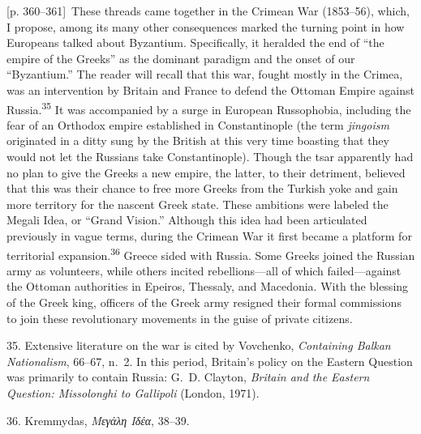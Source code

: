 \documentclass[10pt,a4paper]{article}
\begin{document}
{\scriptsize\color{gray}[p. 360–361]}\ These threads came together in the Crimean War (1853–56), which, I propose, among its many other consequences marked the turning point in how Europeans talked about Byzantium. Specifically, it heralded the end of “the empire of the Greeks” as the dominant paradigm and the onset of our “Byzantium.” The reader will recall that this war, fought mostly in the Crimea, was an intervention by Britain and France to defend the Ottoman Empire against Russia.\nobreak\textsuperscript{35} It was accompanied by a surge in European Russophobia, including the fear of an Orthodox empire established in Constantinople (the term \textit{jingoism} originated in a ditty sung by the British at this very time boasting that they would not let the Russians take Constantinople). Though the tsar apparently had no plan to give the Greeks a new empire, the latter, to their detriment, believed that this was their chance to free more Greeks from the Turkish yoke and gain more territory for the nascent Greek state. These ambitions were labeled the Megali Idea, or “Grand Vision.” Although this idea had been articulated previously in vague terms, during the Crimean War it first became a platform for territorial expansion.\nobreak\textsuperscript{36} Greece sided with Russia. Some Greeks joined the Russian army as volunteers, while others incited rebellions—all of which failed—against the Ottoman authorities in Epeiros, Thessaly, and Macedonia. With the blessing of the Greek king, officers of the Greek army resigned their formal commissions to join these revolutionary movements in the guise of private citizens.\par{\small 35. Extensive literature on the war is cited by Vovchenko, \textit{Containing Balkan Nationalism}, 66–67, n. 2. In this period, Britain’s policy on the Eastern Question was primarily to contain Russia: G. D. Clayton, \textit{Britain and the Eastern Question: Missolonghi to Gallipoli} (London, 1971).\par}{\small 36. Kremmydas, \textit{Μεγάλη Ιδέα}, 38–39.\par}
\end{document}
